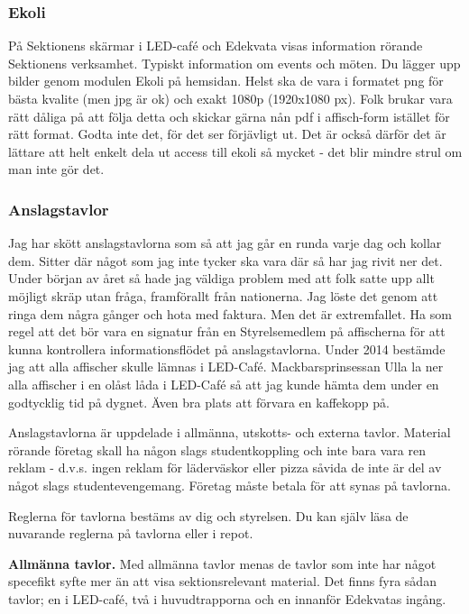 \documentclass[10pt]{article}
\begin{document}
\subsubsection{Ekoli}
På Sektionens skärmar i LED-café och Edekvata visas information rörande Sektionens verksamhet. Typiskt information om events och möten. Du lägger upp bilder genom modulen Ekoli på hemsidan. Helst ska de vara i formatet png för bästa kvalite (men jpg är ok) och exakt 1080p (1920x1080 px). Folk brukar vara rätt dåliga på att följa detta och skickar gärna nån pdf i affisch-form istället för rätt format. Godta inte det, för det ser förjävligt ut. Det är också därför det är lättare att helt enkelt dela ut access till ekoli så mycket - det blir mindre strul om man inte gör det.

\subsubsection{Anslagstavlor}
Jag har skött anslagstavlorna som så att jag går en runda varje dag och kollar dem. Sitter där något som jag inte tycker ska vara där så har jag rivit ner det. Under början av året så hade jag väldiga problem med att folk satte upp allt möjligt skräp utan fråga, framförallt från nationerna. Jag löste det genom att ringa dem några gånger och hota med faktura. Men det är extremfallet. Ha som regel att det bör vara en signatur från en Styrelsemedlem på affischerna för att kunna kontrollera informationsflödet på anslagstavlorna. Under 2014 bestämde jag att alla affischer skulle lämnas i LED-Café.  Mackbarsprinsessan Ulla la ner alla affischer i en olåst låda i LED-Café så att jag kunde hämta dem under en godtycklig tid på dygnet. Även bra plats att förvara en kaffekopp på.

Anslagstavlorna är uppdelade i allmänna, utskotts- och externa tavlor. Material rörande företag skall ha någon slags studentkoppling och inte bara vara ren reklam - d.v.s. ingen reklam för läderväskor eller pizza såvida de inte är del av något slags studentevengemang. Företag måste betala för att synas på tavlorna.

Reglerna för tavlorna bestäms av dig och styrelsen. Du kan själv läsa de nuvarande reglerna på tavlorna eller i repot.

\textbf{Allmänna tavlor.} Med allmänna tavlor menas de tavlor som inte har något specefikt syfte mer än att visa sektionsrelevant material. Det finns fyra sådan tavlor; en i LED-café, två i huvudtrapporna och en innanför Edekvatas ingång.
\end{document}

